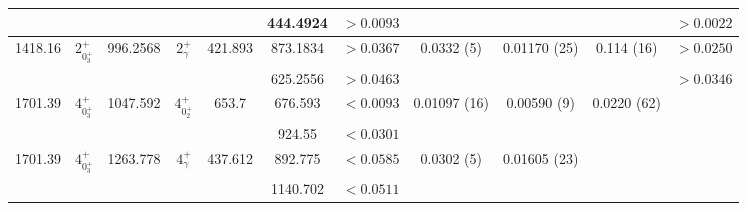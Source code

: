 \begin{landscape}
\begin{longtable}{>{\footnotesize}c|>{\footnotesize}c|>{\footnotesize}c|>{\footnotesize}c|>{\footnotesize}c|>{\footnotesize}c|>{\footnotesize}c|>{\footnotesize}c|>{\footnotesize}c|>{\footnotesize}c|>{\footnotesize}c}
        &  & &  &  & 444.4924 & $>0.0093$ &  & & & $>0.0022$\\ \hline
        1418.16 &  $2^+_{0^+_3}$ & 996.2568 &  $2^+_{\gamma}$ & 421.893 & 873.1834 & $>0.0367$ & 0.0332 (5) & 0.01170 (25) & 0.114 (16) & $>0.0250$\\
        &  & &  &  & 625.2556 & $>0.0463$ & & & & $>0.0346$\\ \hline
        1701.39 & $4^+_{0^+_3}$ & 1047.592 & $4^+_{0^+_2}$ & 653.7 & 676.593 & $<0.0093$ & 0.01097 (16) & 0.00590 (9) & 0.0220 (62)  & \\
        &  & &  &  & 924.55 & $<0.0301$ & & & &\\ \hline
        1701.39 & $4^+_{0^+_3}$ & 1263.778 & $4^+_{\gamma}$ & 437.612 & 892.775 & $<0.0585$ & 0.0302 (5) & 0.01605 (23) &  & \\
        &  & &  &  & 1140.702 & $<0.0511$ & & &  & \\ 
        \bottomrule
    \end{longtable}
\end{landscape}